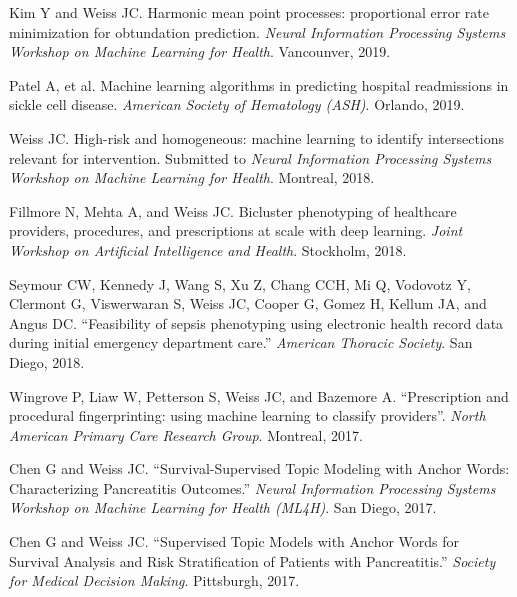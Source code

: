 \begin{bibsection}

\item  Kim Y and Weiss JC.  Harmonic mean point processes: proportional error rate minimization for obtundation prediction. \textit{Neural Information Processing Systems Workshop on Machine Learning for Health}.  Vancounver, 2019.

\item  Patel A, et al.  Machine learning algorithms in predicting hospital readmissions in sickle cell disease.  \textit{American Society of Hematology (ASH)}.  Orlando, 2019.
  
\item  Weiss JC.  High-risk and homogeneous: machine learning to identify intersections relevant for intervention.  Submitted to \textit{Neural Information Processing Systems Workshop on Machine Learning for Health}.  Montreal, 2018.
  
\item  Fillmore N, Mehta A, and Weiss JC. Bicluster phenotyping of healthcare providers, procedures, and prescriptions at scale with deep learning. \textit{Joint Workshop on Artificial Intelligence and Health}. Stockholm, 2018.
  
\item  Seymour CW, Kennedy J, Wang S, Xu Z, Chang CCH, Mi Q, Vodovotz Y, Clermont G, Viswerwaran S, Weiss JC, Cooper G, Gomez H, Kellum JA, and Angus DC. ``Feasibility of sepsis phenotyping using electronic health record data during initial emergency department care.'' \textit{American Thoracic Society}. San Diego, 2018.

\item Wingrove P, Liaw W, Petterson S, Weiss JC, and Bazemore A. ``Prescription and procedural fingerprinting: using machine learning to classify providers''. \emph{North American Primary Care Research Group}. Montreal, 2017.
  
\item  Chen G and Weiss JC. ``Survival-Supervised Topic Modeling with Anchor Words: Characterizing Pancreatitis Outcomes.'' \textit{Neural Information Processing Systems Workshop on Machine Learning for Health (ML4H)}. San Diego, 2017.
  
\item  Chen G and Weiss JC. ``Supervised Topic Models with Anchor Words for Survival Analysis and Risk Stratification of Patients with Pancreatitis.'' \textit{Society for Medical Decision Making}. Pittsburgh, 2017.
  

\end{bibsection}

